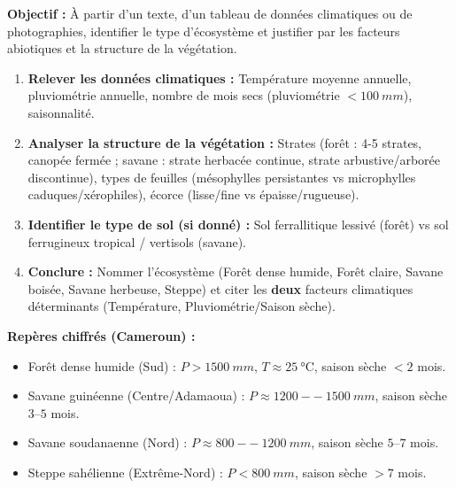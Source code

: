 \documentclass[11pt]{article}
\begin{document}
\begin{methode}
    \textbf{Objectif :} À partir d'un texte, d'un tableau de données climatiques ou de photographies, identifier le type d'écosystème et justifier par les facteurs abiotiques et la structure de la végétation.
    \begin{enumerate}
        \item \textbf{Relever les données climatiques :} Température moyenne annuelle, pluviométrie annuelle, nombre de mois secs (pluviométrie $< \SI{100}{mm}$), saisonnalité.
        \item \textbf{Analyser la structure de la végétation :} Strates (forêt : 4-5 strates, canopée fermée ; savane : strate herbacée continue, strate arbustive/arborée discontinue), types de feuilles (mésophylles persistantes vs microphylles caduques/xérophiles), écorce (lisse/fine vs épaisse/rugueuse).
        \item \textbf{Identifier le type de sol (si donné) :} Sol ferrallitique lessivé (forêt) vs sol ferrugineux tropical / vertisols (savane).
        \item \textbf{Conclure :} Nommer l'écosystème (Forêt dense humide, Forêt claire, Savane boisée, Savane herbeuse, Steppe) et citer les \textbf{deux} facteurs climatiques déterminants (Température, Pluviométrie/Saison sèche).
    \end{enumerate}
    \textbf{Repères chiffrés (Cameroun) :}
    \begin{itemize}
        \item Forêt dense humide (Sud) : $P > \SI{1500}{mm}$, $T \approx \SI{25}{\celsius}$, saison sèche $< 2$ mois.
        \item Savane guinéenne (Centre/Adamaoua) : $P \approx \SI{1200}{--}\SI{1500}{mm}$, saison sèche $3\text{--}5$ mois.
        \item Savane soudanaenne (Nord) : $P \approx \SI{800}{--}\SI{1200}{mm}$, saison sèche $5\text{--}7$ mois.
        \item Steppe sahélienne (Extrême-Nord) : $P < \SI{800}{mm}$, saison sèche $> 7$ mois.
    \end{itemize}
\end{methode}
\end{document}
